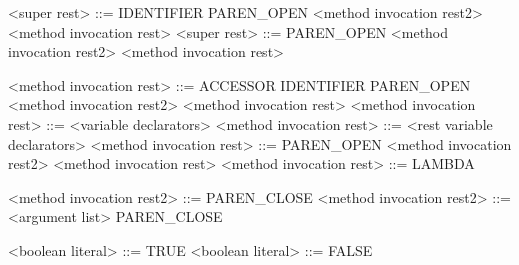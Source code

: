 <super rest>                              ::= IDENTIFIER PAREN_OPEN <method invocation rest2> <method invocation rest>
<super rest>                              ::= PAREN_OPEN <method invocation rest2> <method invocation rest>

<method invocation rest>                  ::= ACCESSOR IDENTIFIER PAREN_OPEN <method invocation rest2> <method invocation rest>
<method invocation rest>                  ::= <variable declarators>
<method invocation rest>                  ::= <rest variable declarators>
<method invocation rest>                  ::= PAREN_OPEN <method invocation rest2> <method invocation rest>
<method invocation rest>                  ::= LAMBDA

<method invocation rest2>                 ::= PAREN_CLOSE
<method invocation rest2>                 ::= <argument list> PAREN_CLOSE

<boolean literal>                         ::= TRUE
<boolean literal>                         ::= FALSE
